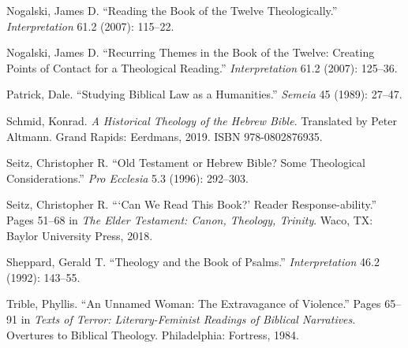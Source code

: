 \documentclass[titlepage]{article}
\begin{document}
\begin{thebibliography}{99}
 Nogalski, James D. “Reading the Book of the Twelve Theologically.” \emph{Interpretation} 61.2 (2007): 115–22.

 Nogalski, James D. “Recurring Themes in the Book of the Twelve: Creating Points of Contact for a Theological Reading.” \emph{Interpretation} 61.2 (2007): 125–36.

 Patrick, Dale. “Studying Biblical Law as a Humanities.” \emph{Semeia} 45 (1989): 27–47.

 Schmid, Konrad. \emph{A Historical Theology of the Hebrew Bible}. Translated by Peter Altmann. Grand Rapids: Eerdmans, 2019. ISBN 978-0802876935.

 Seitz, Christopher R. “Old Testament or Hebrew Bible? Some Theological Considerations.” \emph{Pro Ecclesia} 5.3 (1996): 292–303.

 Seitz, Christopher R. “‘Can We Read This Book?’ Reader Response-ability.” Pages 51–68 in \emph{The Elder Testament: Canon, Theology, Trinity}. Waco, TX: Baylor University Press, 2018.

 Sheppard, Gerald T. “Theology and the Book of Psalms.” \emph{Interpretation} 46.2 (1992): 143–55.

 Trible, Phyllis. “An Unnamed Woman: The Extravagance of Violence.” Pages 65–91 in \emph{Texts of Terror: Literary-Feminist Readings of Biblical Narratives}. Overtures to Biblical Theology. Philadelphia: Fortress, 1984.

\end{thebibliography}
\endgroup
\end{document}

